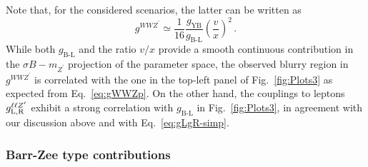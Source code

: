 \documentclass[a4paper,11pt]{article}
\renewcommand{\(}{\left(}
\renewcommand{\)}{\right)}
\renewcommand{\[}{\left[}
\renewcommand{\]}{\right]}
\newcommand{\ro}[1]{\textrm{#1}}
\begin{document}
Note that, for the considered scenarios, the latter can be written as
\begin{equation}
    g^{WWZ^\prime} \simeq \dfrac{1}{16} \dfrac{g_\ro{YB}}{g_\ro{B-L}} \(\dfrac{v}{x}\)^2\,.
    \label{eq:gWWZp}
\end{equation}
While both $g_\ro{B-L}$ and the ratio $v/x$ provide a smooth continuous contribution in the $\sigma B - m_{Z^\prime}$ projection of the parameter space, the observed blurry region in $g^{WWZ^\prime}$ is correlated with the one in the top-left panel of Fig.~\ref{fig:Plots3} as expected from Eq.~\eqref{eq:gWWZp}. On the other hand, the couplings to leptons $g_{\rm L,R}^{\ell \ell Z^\prime}$ exhibit a strong correlation with $g_\ro{B-L}$ in Fig.~\ref{fig:Plots3}, in agreement with our discussion above and with Eq.~\eqref{eq:gLgR-simp}.

\subsubsection{Barr-Zee type contributions}
\label{sec:BarrZee}
\end{document}
